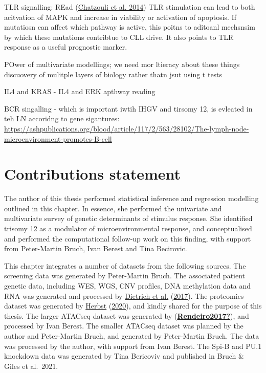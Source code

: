 \documentclass[11pt, a4paper, twosided]{book}
\begin{document}
TLR signalling:
REad (\protect\hyperlink{ref-Chatzouli2014}{Chatzouli et al. 2014})
TLR stimulation can lead to both acitvation of MAPK and increase in viability or activation of apoptosis. If mutatiosn can affect which pathway is active, this poitns to aditoanl mechsnsim by which these mutations contribtue to CLL drive. It also points to TLR response as a useful prognostic marker.

POwer of multivariate modellings;
we need mor ltieracy about these things
discuovery of mulitple layers of biology rather thatn jsut using t tests

IL4 and KRAS - IL4 and ERK apthway reading

BCR singalling - which is important iwtih IHGV and tirsomy 12, is evleated in teh LN accoridng to gene sigantures:
\url{https://ashpublications.org/blood/article/117/2/563/28102/The-lymph-node-microenvironment-promotes-B-cell}

\hypertarget{contributions-statement}{%
\section{Contributions statement}\label{contributions-statement}}

The author of this thesis performed statistical inference and regression modelling outlined in this chapter. In essence, she performed the univariate and multivariate survey of genetic determinants of stimulus response. She identified trisomy 12 as a modulator of microenvironmental response, and conceptualised and performed the computational follow-up work on this finding, with support from Peter-Martin Bruch, Ivan Berest and Tina Becirovic.

This chapter integrates a number of datasets from the following sources. The screening data was generated by Peter-Martin Bruch. The associated patient genetic data, including WES, WGS, CNV profiles, DNA methylation data and RNA was generated and processed by \protect\hyperlink{ref-JCIpaper}{Dietrich et al.} (\protect\hyperlink{ref-JCIpaper}{2017}). The proteomics dataset was generated by \protect\hyperlink{ref-HerbstThesis}{Herbst} (\protect\hyperlink{ref-HerbstThesis}{2020}), and kindly shared for the purpose of this thesis. The larger ATACseq dataset was generated by (\protect\hyperlink{ref-Rendeiro2017}{\textbf{Rendeiro2017?}}), and processed by Ivan Berest. The smaller ATACseq dataset was planned by the author and Peter-Martin Bruch, and generated by Peter-Martin Bruch. The data was processed by the author, with support from Ivan Berest. The Spi-B and PU.1 knockdown data was generated by Tina Bericoviv and published in Bruch \& Giles et al.~2021.
\end{document}
